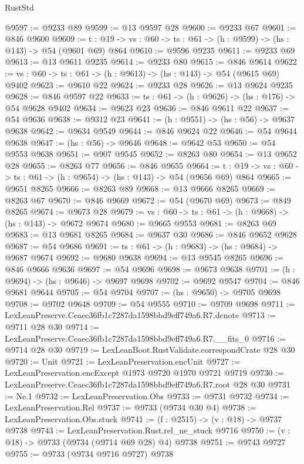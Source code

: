 \begin{lexlean}{RustStd}
\begin{coremodule}
@9597 := @9233 @89
@9599 := @13 @9597 @28
@9600 := @9233 @67
@9601 := @846 @9600
@9609 := {t : @19} -> {vs : @60} -> {ts : @61} -> (h : @9599) -> (hs : @143) -> @54 (@9601 @69) @864
@9610 := @9596 @9235
@9611 := @9233 @69
@9613 := @13 @9611 @9235
@9614 := @9233 @80
@9615 := @846 @9614
@9622 := {vs : @60} -> {ts : @61} -> (h : @9613) -> (hs : @143) -> @54 (@9615 @69) @9402
@9623 := @9610 @22
@9624 := @9233 @28
@9626 := @13 @9624 @9235
@9628 := @846 @9597 @22
@9633 := {ts : @61} -> (h : @9626) -> (hs : @176) -> @54 @9628 @9402
@9634 := @9623 @23
@9636 := @846 @9611 @22
@9637 := @54 @9636
@9638 := @9312 @23
@9641 := (h : @9551) -> (hs : @56) -> @9637 @9638
@9642 := @9634 @9549
@9644 := @846 @9624 @22
@9646 := @54 @9644 @9638
@9647 := (hs : @56) -> @9646
@9648 := @9642 @53
@9650 := @54 @9553 @9638
@9651 := @907 @9545
@9652 := @8263 @80
@9654 := @13 @9652 @28
@9655 := @8263 @77
@9656 := @846 @9655
@9664 := {t : @19} -> {vs : @60} -> {ts : @61} -> (h : @9654) -> (hs : @143) -> @54 (@9656 @69) @864
@9665 := @9651 @8265
@9666 := @8263 @89
@9668 := @13 @9666 @8265
@9669 := @8263 @67
@9670 := @846 @9669
@9672 := @54 (@9670 @69)
@9673 := @849 @8265
@9674 := @9673 @28
@9679 := {vs : @60} -> {ts : @61} -> (h : @9668) -> (hs : @143) -> @9672 @9674
@9680 := @9665 @9553
@9681 := @8263 @69
@9683 := @13 @9681 @8265
@9684 := @9637 @30
@9686 := @846 @9652 @9628
@9687 := @54 @9686
@9691 := {ts : @61} -> (h : @9683) -> (hs : @9684) -> @9687 @9674
@9692 := @9680 @9638
@9694 := @13 @9545 @8265
@9696 := @846 @9666 @9636
@9697 := @54 @9696
@9698 := @9673 @9638
@9701 := (h : @9694) -> (hs : @9646) -> @9697 @9698
@9702 := @9692 @9547
@9704 := @846 @9681 @9644
@9705 := @54 @9704
@9707 := (hs : @9650) -> @9705 @9698
@9708 := @9702 @9648
@9709 := @54 @9555
@9710 := @9709 @9698
@9711 := LexLeanPreserve.Ceaec36fb1c7287da1598bbd9eff749a6.R7.denote
@9713 := @9711 @28 @30
@9714 := LexLeanPreserve.Ceaec36fb1c7287da1598bbd9eff749a6.R7.__fits_0
@9716 := @9714 @28 @30
@9719 := LexLeanBoot.RustValidate.correspondCrate @28 @30
@9720 := Unit
@9721 := LexLeanPreservation.encUnit
@9727 := LexLeanPreservation.encExcept @1973 @9720 @1970 @9721 @9719
@9730 := LexLeanPreserve.Ceaec36fb1c7287da1598bbd9eff749a6.R7.root @28 @30
@9731 := Ne.{1}
@9732 := LexLeanPreservation.Obs
@9733 := @9731 @9732
@9734 := LexLeanPreservation.Rel
@9737 := @9733 (@9734 @30 @4)
@9738 := LexLeanPreservation.Obs.stuck
@9741 := (f : @2515) -> (v : @18) -> @9737 @9738
@9743 := LexLeanPreservation.Rust.rel_ne_stuck @9716
@9750 := (v : @18) -> @9733 (@9734 (@9714 @69 @28) @4) @9738
@9751 := @9743 @9727
@9755 := @9733 (@9734 @9716 @9727) @9738

\end{coremodule}
\end{lexlean}
